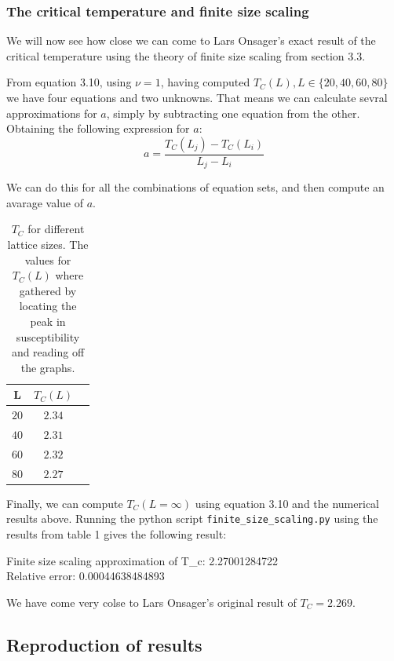 \documentclass[11pt,a4paper,draft]{article}
\numberwithin{equation}{section}
\begin{document}
\subsubsection{The critical temperature and finite size scaling}
We will now see how close we can come to Lars Onsager's exact result of the critical temperature using the theory of finite size scaling from section 3.3.

From equation 3.10, using $\nu = 1$, having computed $T_C(L), L \in \{20,40,60,80 \}$ we have four equations and two unknowns. That means we can calculate sevral approximations for $a$, simply by subtracting one equation from the other. Obtaining the following expression for $a$:
\begin{equation}
a = \frac{T_C(L_j)-T_C(L_i)}{L_j - L_i}
\end{equation}

 We can do this for all the combinations of equation sets, and then compute an avarage value of $a$. 
\begin{table}[!h]
\caption{ $T_C$ for different lattice sizes. The values for $T_C (L)$ where gathered by locating the peak in susceptibility and reading off the graphs.  }
\begin{center}
\vspace{5mm}
\begin{tabular}{| c | c | c |}
	\hline
	L  & $T_C(L)$  \\		\hline		
	$20$ & $2.34$ \\
    $40$ & $2.31$ \\
    $60$ & $2.32$ \\
    $80$ & $2.27$ \\
  \hline
\end{tabular}
\end{center}
\end{table} 

Finally, we can compute $T_C(L=\infty)$ using equation 3.10 and the numerical results above. Running the python script \texttt{finite\_size\_scaling.py} using the results from table 1 gives the following result:

\begin{framed}
\noindent
Finite size scaling approximation of T\_c:  2.27001284722 \\
Relative error:  0.00044638484893
\end{framed}

We have come very colse to Lars Onsager's original result of $T_C = 2.269$. 


\subsection{Reproduction of results}
\end{document}
